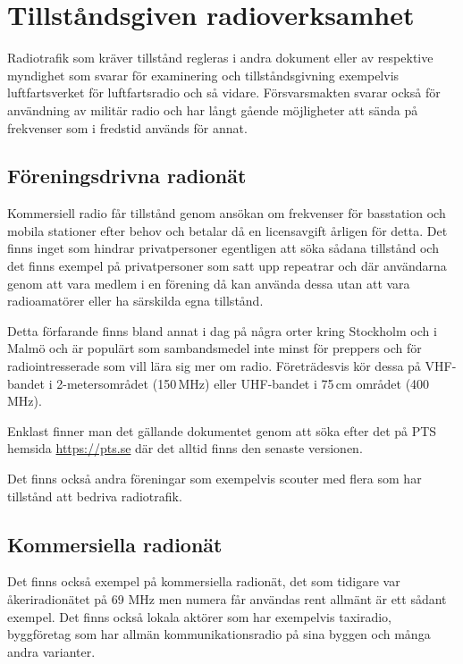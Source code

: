 \section{Tillståndsgiven radioverksamhet}

Radiotrafik som kräver tillstånd regleras i andra dokument eller av respektive
myndighet som svarar för examinering och tillståndsgivning exempelvis
luftfartsverket för luftfartsradio och så vidare. Försvarsmakten svarar också
för användning av militär radio och har långt gående möjligheter att sända på
frekvenser som i fredstid används för annat.

\subsection{Föreningsdrivna radionät}

Kommersiell radio får tillstånd genom ansökan om frekvenser för basstation och
mobila stationer efter behov och betalar då en licensavgift årligen för
detta. Det finns inget som hindrar privatpersoner egentligen att söka sådana
tillstånd och det finns exempel på privatpersoner som satt upp repeatrar och där
användarna genom att vara medlem i en förening då kan använda dessa utan att
vara radioamatörer eller ha särskilda egna tillstånd.

Detta förfarande finns bland annat i dag på några orter kring Stockholm och i
Malmö och är populärt som sambandsmedel inte minst för preppers och för
radiointresserade som vill lära sig mer om radio. Företrädesvis kör dessa på
VHF-bandet i 2-metersområdet (150\,MHz) eller UHF-bandet i 75\,cm området
(400\,MHz).

Enklast finner man det gällande dokumentet genom att söka efter det på PTS
hemsida \url{https://pts.se} där det alltid finns den senaste versionen.

Det finns också andra föreningar som exempelvis scouter med flera som har
tillstånd att bedriva radiotrafik.

\subsection{Kommersiella radionät}

Det finns också exempel på kommersiella radionät, det som tidigare var
åkeriradionätet på 69 MHz men numera får användas rent allmänt är ett sådant
exempel. Det finns också lokala aktörer som har exempelvis taxiradio,
byggföretag som har allmän kommunikationsradio på sina byggen och många andra
varianter.

